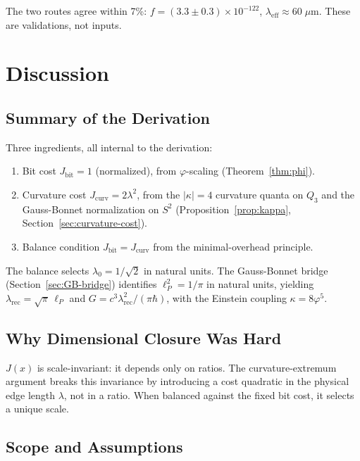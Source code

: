 \documentclass[12pt]{article}
\theoremstyle{definition}
\theoremstyle{remark}
\begin{document}
The two routes agree within 7\%:
$f = (3.3 \pm 0.3) \times 10^{-122}$,
$\lambda_{\mathrm{eff}} \approx 60\;\mu\mathrm{m}$.
These are validations, not inputs.

\section{Discussion}
\label{sec:discussion}

\subsection{Summary of the Derivation}

Three ingredients, all internal to the derivation:
\begin{enumerate}
  \item Bit cost $J_{\mathrm{bit}} = 1$ (normalized), from
    $\varphi$-scaling (Theorem~\ref{thm:phi}).
  \item Curvature cost $J_{\mathrm{curv}} = 2\lambda^2$, from the
    $|\kappa| = 4$ curvature quanta on $Q_3$ and the Gauss-Bonnet
    normalization on $S^2$
    (Proposition~\ref{prop:kappa},
    Section~\ref{sec:curvature-cost}).
  \item Balance condition $J_{\mathrm{bit}} = J_{\mathrm{curv}}$
    from the minimal-overhead principle.
\end{enumerate}
The balance selects $\lambda_0 = 1/\sqrt{2}$ in natural units.
The Gauss-Bonnet bridge (Section~\ref{sec:GB-bridge}) identifies
$\ell_P^2 = 1/\pi$ in natural units, yielding
$\lambda_{\mathrm{rec}} = \sqrt{\pi}\,\ell_P$ and
$G = c^3 \lambda_{\mathrm{rec}}^2/(\pi\hbar)$, with the Einstein
coupling $\kappa = 8\varphi^5$.

\subsection{Why Dimensional Closure Was Hard}

$J(x)$ is scale-invariant: it depends only on ratios. The
curvature-extremum argument breaks this invariance by introducing a
cost quadratic in the physical edge length $\lambda$, not in a ratio.
When balanced against the fixed bit cost, it selects a unique scale.

\subsection{Scope and Assumptions}
\label{sec:scope}
\end{document}
